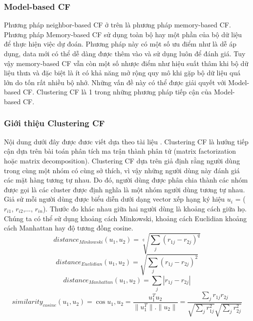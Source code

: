 \subsubsection{Model-based CF}
Phương pháp neighbor-based CF ở trên là phương pháp memory-based CF. Phương pháp Memory-based CF sử dụng toàn bộ hay một phần của bộ dữ liệu để thực hiện việc dự đoán. Phương pháp này có một số ưu điểm như là dễ áp dụng, data mới có thể dễ dàng được thêm vào và sử dụng luôn để đánh giá. Tuy vậy memory-based CF vẫn còn một số nhược điểm như hiệu suất thâm khi bộ dữ liệu thưa và đặc biệt là ít có khả năng mở rộng quy mô khi gặp bộ dữ liệu quá lớn do tốn rất nhiều bộ nhớ. Những vấn đề này có thể được giải quyết với Model-based CF. Clustering CF là 1 trong những phương pháp tiếp cận của Model-based CF.

\subsubsection{Giới thiệu Clustering CF}
\noindent Nội dung dưới đây được đươc viết dựa theo tài liệu \cite{locnguyen2010modelbased}.
\newline Clustering \gls{CF} là hướng tiếp cận dựa trên bài toán phân tích ma trận thành phân tử (matrix factorization hoặc matrix decomposition). Clustering \gls{CF} dựa trên giả định rằng người dùng trong cùng một nhóm có cùng sở thích, vì vậy những người dùng này đánh giá các mặt hàng tương tự nhau. Do đó, người dùng được phân chia thành các nhóm được gọi là các cluster được định nghĩa là một nhóm người dùng tương tự nhau.
\newline Giả sử mỗi người dùng được biểu diễn dưới dạng vector xếp hạng ký hiệu $u_i$ = ($r_{i1}$, $r_{i2}$,..., $r_{in}$). Thước đo khác nhau giữa hai người dùng là khoảng cách giữa họ. Chúng ta có thể sử dụng khoảng cách Minkowski, khoảng cách Euclidian khoảng cách Manhattan hay độ tương đồng cosine.
$$ distance_{Minkowski}(u_1,u_2) = \sqrt[q]{\underset{j}{\sum}(r_{1j} - r_{2j})^q} $$
$$ distance_{Euclidian}(u_1,u_2) = \sqrt{\underset{j}{\sum}(r_{1j} - r_{2j})^2} $$
$$ distance_{Manhattan}(u_1,u_2) = \underset{j}{\sum}|r_{1j} - r_{2j}| $$
$$ similarity_{cosine} (u_1,u_2) = \cos{u_1, u_2} = \frac{u^T_1 u_2}{\|u^T_1\|.\|u_2\|} = \frac{\underset{j}{\sum}r_{1j} r_{2j}}{\sqrt{\underset{j}{\sum}r_{1j}^2} \sqrt{\underset{j}{\sum}r_{2j}^2}} $$

